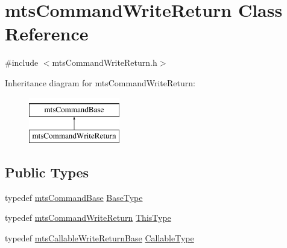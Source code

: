 \hypertarget{classmts_command_write_return}{\section{mts\-Command\-Write\-Return Class Reference}
\label{classmts_command_write_return}
}


{\ttfamily \#include $<$mts\-Command\-Write\-Return.\-h$>$}

Inheritance diagram for mts\-Command\-Write\-Return\-:\begin{figure}[H]
\begin{center}
\leavevmode
\includegraphics[height=2.000000cm]{d0/d0d/classmts_command_write_return}
\end{center}
\end{figure}
\subsection*{Public Types}
\begin{DoxyCompactItemize}
\item 
typedef \hyperlink{classmts_command_base}{mts\-Command\-Base} \hyperlink{classmts_command_write_return_a77f6a3a0512f7914b99f53dfe307a798}{Base\-Type}
\item 
typedef \hyperlink{classmts_command_write_return}{mts\-Command\-Write\-Return} \hyperlink{classmts_command_write_return_a134ad936dafcef1c96fb73c9a2ff8a8d}{This\-Type}
\item 
typedef \hyperlink{classmts_callable_write_return_base}{mts\-Callable\-Write\-Return\-Base} \hyperlink{classmts_command_write_return_ac99dff53e64c78801540f606bb3b701b}{Callable\-Type}
\end{DoxyCompactItemize}
